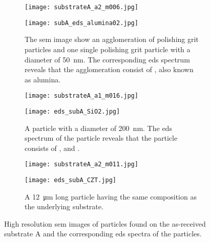 \begin{figure}
    \centering
    \begin{subfigure}[t]{\textwidth}
          \begin{minipage}[t]{0.49\linewidth}
            \centering
            \texttt{[image: substrateA\_a2\_m006.jpg]}
          \end{minipage}
          \hfill
          \begin{minipage}[t]{0.49\linewidth}
            \centering
            \texttt{[image: subA\_eds\_alumina02.jpg]}
          \end{minipage}
        \caption{The \ac{sem} image show an agglomeration of polishing grit particles and one single polishing grit particle with a diameter of \SI{50}{\nano\metre}. The corresponding \ac{eds} spectrum reveals that the agglomeration consist of , also known as alumina.}\label{fig:subAa_polishing-grit}
    \end{subfigure}
    \par\bigskip
    \begin{subfigure}[t]{\textwidth}
          \begin{minipage}[t]{0.49\linewidth}
            \centering
            \texttt{[image: substrateA\_a1\_m016.jpg]}
          \end{minipage}
          \hfill
          \begin{minipage}[t]{0.49\linewidth}
            \centering
            \texttt{[image: eds\_subA\_SiO2.jpg]}
          \end{minipage}
        \caption{A particle with a diameter of \SI{200}{\nano\metre}. The \ac{eds} spectrum of the particle reveals that the particle consists of ,  and .}\label{fig:subAa_large-grit}
    \end{subfigure}
    \par\bigskip
    \begin{subfigure}[t]{\textwidth}
          \begin{minipage}[t]{0.49\linewidth}
            \centering
            \texttt{[image: substrateA\_a2\_m011.jpg]}
          \end{minipage}
          \hfill
          \begin{minipage}[t]{0.49\linewidth}
            \centering
            \texttt{[image: eds\_subA\_CZT.jpg]}
          \end{minipage}
        \caption{A \SI{12}{\micro\metre} long particle having the same composition as the underlying substrate.}\label{fig:subAa_czt-particle}
    \end{subfigure}
    \caption[\Ac{sem} images and \ac{eds} spectra of particles found on as-received substrate A.]{High resolution \acf{sem} images of particles found on the as-received substrate A and the corresponding \acf{eds} spectra of the particles.}\label{fig:subAa_sem_w_eds}
\end{figure}


